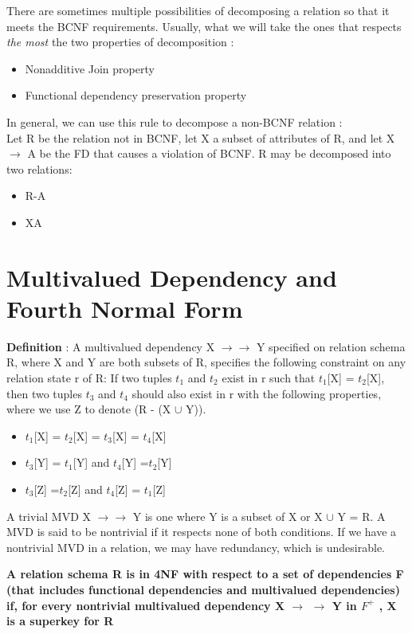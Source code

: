 There are sometimes multiple possibilities of decomposing a relation so that it meets the BCNF requirements. Usually, what we will take the ones that respects \textit{the most} the two properties of decomposition :
\begin{itemize}
\item Nonadditive Join property
\item Functional dependency preservation property
\end{itemize}

In general, we can use this rule to decompose a non-BCNF relation :\\

Let R be the relation not in BCNF, let X a subset of attributes of R, and let X $\rightarrow$ A be the FD that causes a violation of BCNF. R may be decomposed into two relations:
\begin{itemize}
\item R-A
\item XA
\end{itemize}


\section{Multivalued Dependency and Fourth Normal Form}
\textbf{Definition} : A multivalued dependency X $\rightarrow \rightarrow$ Y specified on relation schema R, where X and Y are both subsets of R, specifies the following constraint on any relation state r of R: If two tuples $t_1$ and $t_2$ exist in r such that $t_1$[X] = $t_2$[X], then two tuples $t_3$ and $t_4$ should also exist in r with the following properties, where we use Z to denote (R - (X $\cup$  Y)).
\begin{itemize}
\item $t_1$[X] = $t_2$[X] = $t_3$[X] = $t_4$[X]
\item $t_3$[Y] = $t_1$[Y] and $t_4$[Y] =$t_2$[Y]
\item $t_3$[Z] =$t_2$[Z] and $t_4$[Z] = $t_1$[Z]  \\
\end{itemize}

A trivial MVD X $\rightarrow \rightarrow$ Y is one where Y is a subset of X or X $\cup$ Y = R. A MVD is said to be nontrivial if it respects none of both conditions. If we have a nontrivial MVD in a relation, we may have redundancy, which is undesirable.

\begin{center}
\textbf{A relation schema R is in 4NF with respect to a set of dependencies F (that includes functional dependencies and multivalued dependencies) if, for
every nontrivial multivalued dependency X $\rightarrow$
$\rightarrow$ Y in $F^+$ , X is a superkey for R}
\end{center}

